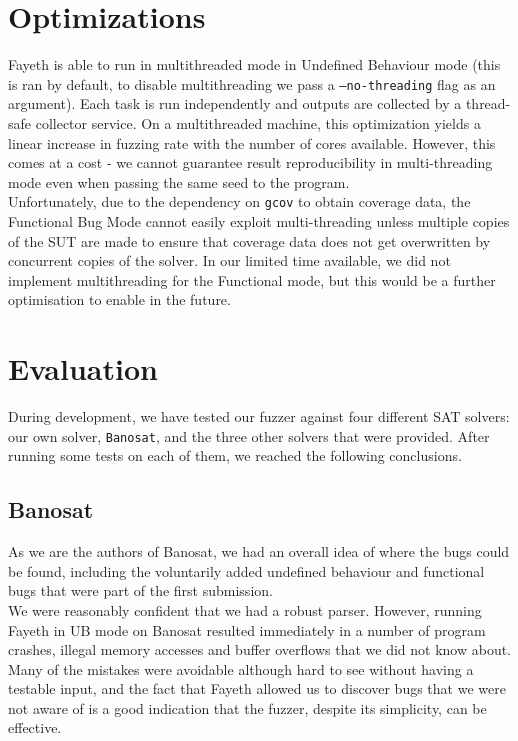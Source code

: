 \documentclass{article}
\begin{document}
\section{Optimizations}

Fayeth is able to run in multithreaded mode in Undefined Behaviour mode (this is ran by default, to disable multithreading we pass a \texttt{--no-threading} flag as an argument). Each task is run independently
and outputs are collected by a thread-safe collector service. On a multithreaded machine, this optimization
yields a linear increase in fuzzing rate with the number of cores available. However, this comes at a cost - we cannot guarantee result reproducibility in multi-threading mode even when passing the same seed to the program.\\

Unfortunately, due to the dependency on \verb|gcov| to obtain coverage data, the Functional Bug Mode cannot
easily exploit multi-threading unless multiple copies of the SUT are made to ensure that coverage data does
not get overwritten by concurrent copies of the solver. In our limited time available, we did not implement
multithreading for the Functional mode, but this would be a further optimisation to enable in the future.

\section{Evaluation}

During development, we have tested our fuzzer against four different SAT solvers: our own solver, \verb|Banosat|, and
the three other solvers that were provided. After running some tests on each of them, we reached the following conclusions.

\subsection{Banosat}

As we are the authors of Banosat, we had an overall idea of where the bugs could be found, 
including the voluntarily added undefined behaviour and functional bugs that were part of the first submission.\\

We were reasonably confident that we had a robust parser. However, running Fayeth in UB mode on
Banosat resulted immediately in a number of program crashes, illegal memory accesses and buffer overflows
that we did not know about. Many of the mistakes were avoidable although hard to see without having
a testable input, and the fact that Fayeth allowed us to discover bugs that we were not aware of is
a good indication that the fuzzer, despite its simplicity, can be effective. \\
\end{document}
